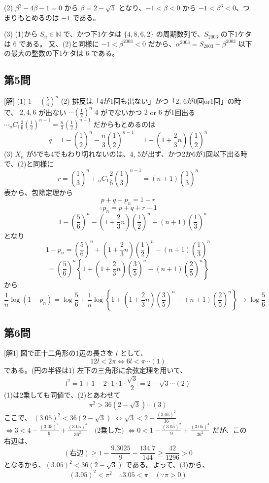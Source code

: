 \documentclass[../main.tex]{subfiles}
\begin{document}
(2) $\beta^2-4\beta-1=0$ から $\beta = 2-\sqrt{5}$ となり、$-1 < \beta < 0$ から $-1 < \beta^3 < 0$、つまりもとめるのは $-1$ である。

(3) (1)から $S_n \in \mathbb{N}$ で、かつ下1ケタは $\{4, 8, 6, 2\}$ の周期数列で、$S_{2003}$ の下1ケタは $6$ である。
又、(2)と同様に $-1 < \beta^{2003} < 0$ だから、$\alpha^{2003} = S_{2003} - \beta^{2003}$ 以下の最大の整数の下1ケタは $6$ である。

\subsection*{第5問}
[解] (1) $1 - (\frac{5}{6})^n$
(2) 排反は「4が1回も出ない」かつ「2, 6が0回or1回」の時で、
$2, 4, 6$ が出ない $\cdots (\frac{1}{2})^n$
$4$ がでないかつ $2$ or $6$ が1回出る $\cdots {}_n C_1 \frac{2}{6} (\frac{1}{2})^{n-1} = \frac{n}{3}(\frac{1}{2})^{n-1}$
だからもとめるのは
$$q = 1 - (\frac{1}{2})^n - \frac{n}{3}(\frac{1}{2})^{n-1} = 1 - (1+\frac{2}{3}n)(\frac{1}{2})^n$$
(3) $X_n$ が5でも4でもわり切れないのは、4, 5が出ず、かつ2か6が1回以下出る時で、(2)と同様に
$$r = (\frac{1}{3})^n + {}_n C_1 \frac{2}{6} (\frac{1}{3})^{n-1} = (n+1)(\frac{1}{3})^n$$
表から、包除定理から
$$p+q-p_n = 1-r$$
$$\therefore p_n = p+q+r-1$$
$$= 1 - (\frac{5}{6})^n - (1+\frac{2}{3}n)(\frac{1}{2})^n + (n+1)(\frac{1}{3})^n$$
となり
$$1-p_n = (\frac{5}{6})^n + (1+\frac{2}{3}n)(\frac{1}{2})^n - (n+1)(\frac{1}{3})^n$$
$$= (\frac{5}{6})^n \left\{ 1 + (1+\frac{2}{3}n)(\frac{3}{5})^n - (n+1)(\frac{2}{5})^n \right\}$$
から
$$\frac{1}{n} \log (1-p_n) = \log \frac{5}{6} + \frac{1}{n} \log \left\{ 1 + (1+\frac{2}{3}n)(\frac{3}{5})^n - (n+1)(\frac{2}{5})^n \right\} \to \log \frac{5}{6}$$

\subsection*{第6問}
[解1] 図で正十二角形の1辺の長さを $l$ として、
$$12l < 2\pi \iff 6l < \pi \cdots (1)$$
である。(円の半径は1) 左下の三角形に余弦定理を用いて、
$$l^2 = 1+1 - 2\cdot 1\cdot 1\cdot \frac{\sqrt{3}}{2} = 2-\sqrt{3} \cdots (2)$$
(1)は2乗しても同値で、(2)とあわせて
$$\pi^2 > 36(2-\sqrt{3}) \cdots (3)$$
ここで、
$(3.05)^2 < 36(2-\sqrt{3})$
$\iff \sqrt{3} < 2 - \frac{(3.05)^2}{36}$
$\iff 3 < 4 - \frac{(3.05)^2}{9} + \frac{(3.05)^4}{36^2} \quad \text{(2乗した)}$
$\iff 0 < 1 - \frac{(3.05)^2}{9} + \frac{(3.05)^4}{36^2}$
だが、この右辺は、
$$(\text{右辺}) \ge 1 - \frac{9.3025}{9} - \frac{134.7}{144} \ge \frac{42}{1296} > 0$$
となるから、$(3.05)^2 < 36(2-\sqrt{3})$ である。よって、(3)から、
$$(3.05)^2 < \pi^2 \quad \therefore 3.05 < \pi \quad (\because \pi > 0)$$
\end{document}
